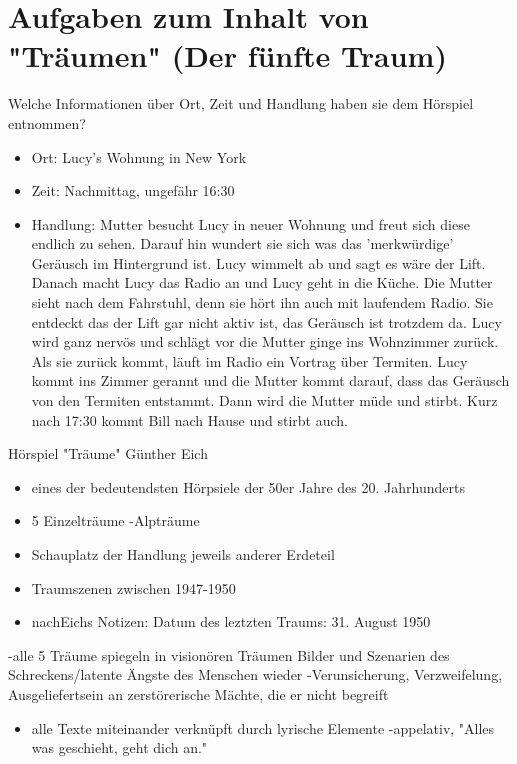 \documentclass{article}
\begin{document}
\section{Aufgaben zum Inhalt von "Träumen" (Der fünfte Traum)}
Welche Informationen über Ort, Zeit und Handlung haben sie dem Hörspiel entnommen?
\begin{itemize}
  \item Ort: Lucy's Wohnung in New York
  \item Zeit: Nachmittag, ungefähr 16:30
  \item Handlung: Mutter besucht Lucy in neuer Wohnung und freut sich diese endlich zu sehen. Darauf hin wundert sie sich was das 'merkwürdige' Geräusch im Hintergrund ist. Lucy wimmelt ab und sagt es wäre der Lift. Danach macht Lucy das Radio an und Lucy geht in die Küche. Die Mutter sieht nach dem Fahrstuhl, denn sie hört ihn auch mit laufendem Radio. Sie entdeckt das der Lift gar nicht aktiv ist, das Geräusch ist trotzdem da. Lucy wird ganz nervös und schlägt vor die Mutter ginge ins Wohnzimmer zurück. Als sie zurück kommt, läuft im Radio ein Vortrag über Termiten. Lucy kommt ins Zimmer gerannt und die Mutter kommt darauf, dass das Geräusch von den Termiten entstammt. Dann wird die Mutter müde und stirbt. Kurz nach 17:30 kommt Bill nach Hause und stirbt auch.
\end{itemize}

\par

Hörspiel "Träume"  Günther Eich
\begin{itemize}
  \item eines der bedeutendsten Hörpsiele der 50er Jahre des 20. Jahrhunderts
  \item 5 Einzelträume -\guilsinglright Alpträume
  \item Schauplatz der Handlung jeweils anderer Erdeteil
  \item Traumszenen zwischen 1947-1950
  \item nachEichs Notizen: Datum des leztzten Traums: 31. August 1950
\end{itemize}

\par

-\guilsinglright alle 5 Träume spiegeln in visionören Träumen Bilder und Szenarien des Schreckens/latente Ängste des Menschen wieder -\guilsinglright Verunsicherung, Verzweifelung, Ausgeliefertsein an zerstörerische Mächte, die er nicht begreift

\begin{itemize}
  \item alle Texte miteinander verknüpft durch lyrische Elemente -\guilsinglright appelativ, "Alles was geschieht, geht dich an."
\end{itemize}
\end{document}
